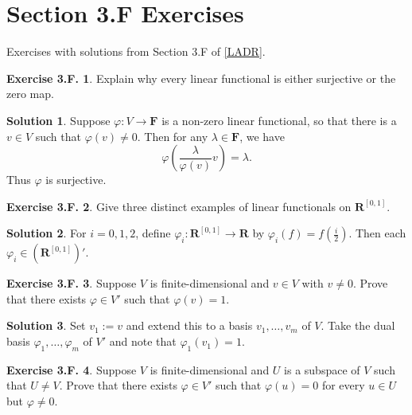 \documentclass[12pt]{article}
\theoremstyle{definition}
\theoremstyle{exercise}
\newtheorem{exercise}{Exercise 3.F.}
\theoremstyle{solution}
\newtheorem*{solution}{Solution}
\newcommand{\R}{\mathbf{R}}
\newcommand{\F}{\mathbf{F}}
\begin{document}
\section{Section 3.F Exercises}

Exercises with solutions from Section 3.F of \hyperlink{ladr}{[LADR]}.

\begin{exercise}
\label{ex:1}
    Explain why every linear functional is either surjective or the zero map.
\end{exercise}

\begin{solution}
    Suppose \( \varphi : V \to \F \) is a non-zero linear functional, so that there is a \( v \in V \) such that \( \varphi(v) \neq 0 \). Then for any \( \lambda \in \F \), we have
    \[
        \varphi \left( \frac{\lambda}{\varphi(v)} v \right) = \lambda.
    \]
    Thus \( \varphi \) is surjective.
\end{solution}

\begin{exercise}
\label{ex:2}
    Give three distinct examples of linear functionals on \( \R^{[0,1]} \).
\end{exercise}

\begin{solution}
    For \( i = 0, 1, 2 \), define \( \varphi_i : \R^{[0,1]} \to \R \) by \( \varphi_i(f) = f \left( \tfrac{i}{2} \right) \). Then each \( \varphi_i \in \left( \R^{[0,1]} \right)' \).
\end{solution}

\begin{exercise}
\label{ex:3}
    Suppose \( V \) is finite-dimensional and \( v \in V \) with \( v \neq 0 \). Prove that there exists \( \varphi \in V' \) such that \( \varphi(v) = 1 \).
\end{exercise}

\begin{solution}
    Set \( v_1 := v \) and extend this to a basis \( v_1, \ldots, v_m \) of \( V \). Take the dual basis \( \varphi_1, \ldots, \varphi_m \) of \( V' \) and note that \( \varphi_1(v_1) = 1 \).
\end{solution}

\begin{exercise}
\label{ex:4}
    Suppose \( V \) is finite-dimensional and \( U \) is a subspace of \( V \) such that \( U \neq V \). Prove that there exists \( \varphi \in V' \) such that \( \varphi(u) = 0 \) for every \( u \in U \) but \( \varphi \neq 0 \).
\end{exercise}
\end{document}
